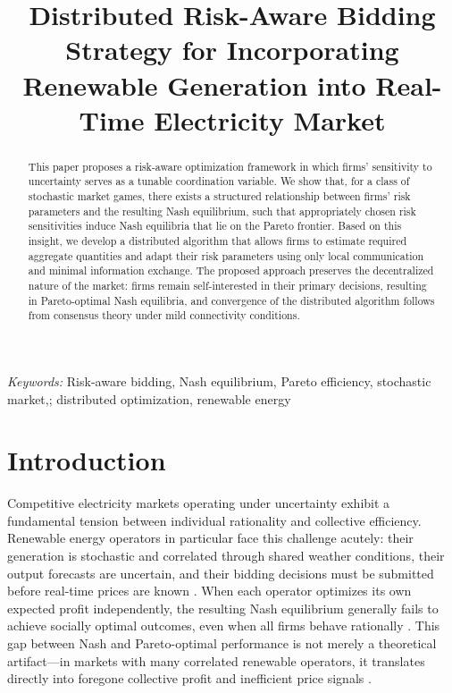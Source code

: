 \documentclass[conference]{IEEEtran}
\title{Distributed Risk-Aware Bidding Strategy for Incorporating Renewable Generation into Real-Time Electricity Market}
\author{\IEEEauthorblockN{Tommy Truong, Zhihua Qu, and Marwan A. Simaan}
\IEEEauthorblockA{University of Central Florida}}
\begin{document}
\maketitle

\begin{abstract}
This paper proposes a risk-aware optimization framework in which firms' sensitivity to uncertainty serves as a tunable coordination variable. We show that, for a class of stochastic market games, there exists a structured relationship between firms' risk parameters and the resulting Nash equilibrium, such that appropriately chosen risk sensitivities induce Nash equilibria that lie on the Pareto frontier. Based on this insight, we develop a distributed algorithm that allows firms to estimate required aggregate quantities and adapt their risk parameters using only local communication and minimal information exchange. The proposed approach preserves the decentralized nature of the market: firms remain self-interested in their primary decisions, resulting in Pareto-optimal Nash equilibria, and convergence of the distributed algorithm follows from consensus theory under mild connectivity conditions.
\end{abstract}

{\it Keywords:} Risk-aware bidding, Nash equilibrium, Pareto efficiency, stochastic market,; distributed optimization, renewable energy 

\section{Introduction}

Competitive electricity markets operating under uncertainty exhibit a fundamental tension between individual rationality and collective efficiency.
Renewable energy operators in particular face this challenge acutely: their generation is stochastic and correlated through shared weather conditions,
their output forecasts are uncertain, and their bidding decisions must be submitted before real-time prices are known
\cite{dvorkin2020chance, wong2007pricing, mieth2020distribution}.
When each operator optimizes its own expected profit independently, the resulting Nash equilibrium generally fails to achieve socially optimal outcomes,
even when all firms behave rationally \cite{zhang2016competition, lee2015rational}.
This gap between Nash and Pareto-optimal performance is not merely a theoretical artifact---in markets with many correlated renewable operators,
it translates directly into foregone collective profit and inefficient price signals \cite{asplund2002risk, wambach1999bertrand}.
\end{document}
